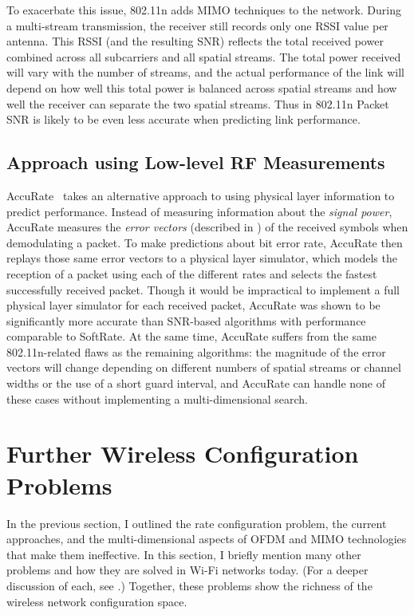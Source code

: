 To exacerbate this issue, 802.11n adds MIMO techniques to the network. During a multi-stream transmission, the receiver still records only one RSSI value per antenna. This RSSI (and the resulting SNR) reflects the total received power combined across all subcarriers and all spatial streams. The total power received will vary with the number of streams, and the actual performance of the link will depend on how well this total power is balanced across spatial streams and how well the receiver can separate the two spatial streams. Thus in 802.11n Packet SNR is likely to be even less accurate when predicting link performance.

\subsection{Approach using Low-level RF Measurements}
\label{sec:accurate}
AccuRate~\cite{Sen_AccuRate} takes an alternative approach to using physical layer information to predict performance. Instead of measuring information about the \emph{signal power}, AccuRate measures the \emph{error vectors} (described in ) of the received symbols when demodulating a packet. To make predictions about bit error rate, AccuRate then replays those same error vectors to a physical layer simulator, which models the reception of a packet using each of the different rates and selects the fastest successfully received packet. Though it would be impractical to implement a full physical layer simulator for each received packet, AccuRate was shown to be significantly more accurate than SNR-based algorithms with performance comparable to SoftRate. At the same time, AccuRate suffers from the same 802.11n-related flaws as the remaining algorithms: the magnitude of the error vectors will change depending on different numbers of spatial streams or channel widths or the use of a short guard interval, and AccuRate can handle none of these cases without implementing a multi-dimensional search.

\section{Further Wireless Configuration Problems}
\label{sec:problems_11n}
In the previous section, I outlined the rate configuration problem, the current approaches, and the multi-dimensional aspects of OFDM and MIMO technologies that make them ineffective. In this section, I briefly mention many other problems and how they are solved in Wi-Fi networks today. (For a deeper discussion of each, see .) Together, these problems show the richness of the wireless network configuration space.

